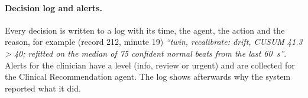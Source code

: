 \paragraph{Decision log and alerts.} Every decision is written to a log with its time, the agent, the action and the reason, for example (record 212, minute 19) \emph{``twin, recalibrate: drift, CUSUM 41.3 > 40; refitted on the median of 75 confident normal beats from the last 60~s''}. Alerts for the clinician have a level (info, review or urgent) and are collected for the Clinical Recommendation agent. The log shows afterwards why the system reported what it did.

